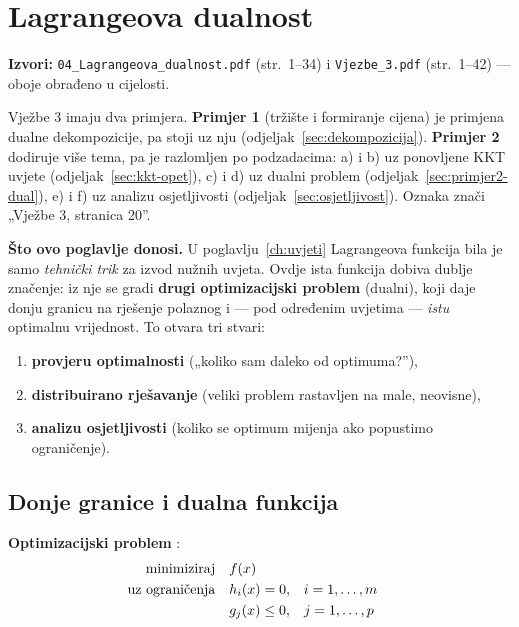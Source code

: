 \chapter{Lagrangeova dualnost}
\label{ch:dualnost}

\begin{izvor}
\textbf{Izvori:} \texttt{04\_Lagrangeova\_dualnost.pdf} (str.\ 1--34) i
\texttt{Vjezbe\_3.pdf} (str.\ 1--42) --- oboje obrađeno u cijelosti.

Vježbe 3 imaju dva primjera. \textbf{Primjer 1} (tržište i formiranje cijena)
je primjena dualne dekompozicije, pa stoji uz nju
(odjeljak~\ref{sec:dekompozicija}). \textbf{Primjer 2} dodiruje više tema, pa je
razlomljen po podzadacima: a) i b) uz ponovljene KKT uvjete
(odjeljak~\ref{sec:kkt-opet}), c) i d) uz dualni problem
(odjeljak~\ref{sec:primjer2-dual}), e) i f) uz analizu osjetljivosti
(odjeljak~\ref{sec:osjetljivost}). Oznaka  znači „Vježbe 3,
stranica 20”.
\end{izvor}

\textbf{Što ovo poglavlje donosi.} U poglavlju~\ref{ch:uvjeti} Lagrangeova
funkcija bila je samo \emph{tehnički trik} za izvod nužnih uvjeta. Ovdje ista
funkcija dobiva dublje značenje: iz nje se gradi \textbf{drugi optimizacijski
problem} (dualni), koji daje donju granicu na rješenje polaznog i --- pod
određenim uvjetima --- \emph{istu} optimalnu vrijednost. To otvara tri stvari:

\begin{enumerate}
  \item \textbf{provjeru optimalnosti} („koliko sam daleko od optimuma?”),
  \item \textbf{distribuirano rješavanje} (veliki problem rastavljen na male,
        neovisne),
  \item \textbf{analizu osjetljivosti} (koliko se optimum mijenja ako popustimo
        ograničenje).
\end{enumerate}

\section{Donje granice i dualna funkcija}
\label{sec:donje-granice}

\textbf{Optimizacijski problem} :
\begin{equation}
\begin{aligned}
\minim & f(x) \\
\uzogr & h_i(x) = 0, && i = 1,\dots,m \\
       & g_j(x) \le 0, && j = 1,\dots,p
\end{aligned}
\end{equation}

